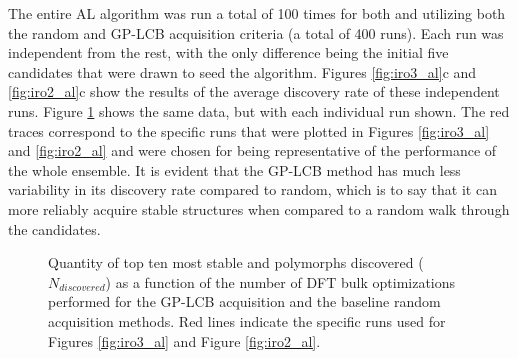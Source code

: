 %
%
The entire AL algorithm was run a total of \num{100} times for both \IrOtwo and \IrOthree utilizing both the random and GP-LCB acquisition criteria (a total of \num{400} runs).
%
Each run was independent from the rest, with the only difference being the initial five candidates that were drawn to seed the algorithm.
%
Figures \ref{fig:iro3_al}c and \ref{fig:iro2_al}c show the results of the average discovery rate of these independent runs.
%
Figure \ref{fig:disc_rate} shows the same data, but with each individual run shown.
%
The red traces correspond to the specific runs that were plotted in Figures \ref{fig:iro3_al} and \ref{fig:iro2_al} and were chosen for being representative of the performance of the whole ensemble.
%
It is evident that the GP-LCB method has much less variability in its discovery rate compared to random, which is to say that it can more reliably acquire stable structures when compared to a random walk through the candidates.



\begin{figure}[!htb]
\centering
{}
\caption{\label{fig:disc_rate}
%
Quantity of top ten most stable \IrOtwo and \IrOthree polymorphs discovered ($N_{discovered}$) as a function of the number of DFT bulk optimizations performed for the GP-LCB acquisition and the baseline random acquisition methods.
%
Red lines indicate the specific runs used for Figures \ref{fig:iro3_al} and Figure \ref{fig:iro2_al}.
}
\end{figure}


